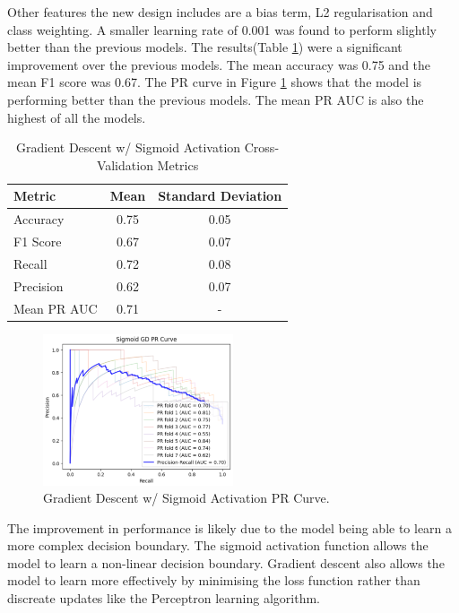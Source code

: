 Other features the new design includes are a bias term, L2 regularisation and class weighting. A smaller learning rate of 0.001 was found to perform slightly better than the previous models. The results(Table \ref{tab:gd_metrics}) were a significant improvement over the previous models. The mean accuracy was 0.75 and the mean F1 score was 0.67. The PR curve in Figure \ref{fig:gd_pr} shows that the model is performing better than the previous models. The mean PR AUC is also the highest of all the models.

\begin{table}[ht!]
    \centering
    \begin{tabular}{lcc}
        \toprule
        \textbf{Metric} & \textbf{Mean} & \textbf{Standard Deviation} \\
        \midrule
        Accuracy & 0.75 & 0.05 \\
        F1 Score & 0.67 & 0.07 \\
        Recall & 0.72 & 0.08 \\
        Precision & 0.62 & 0.07 \\
        Mean PR AUC & 0.71 & - \\
        \bottomrule
    \end{tabular}
    \caption{Gradient Descent w/ Sigmoid Activation Cross-Validation Metrics}
    \label{tab:gd_metrics}
\end{table}

\begin{figure}[ht!]
    \centering
    \includegraphics[width=0.5\textwidth]{images/gd_pr.png}
    \caption{Gradient Descent w/ Sigmoid Activation PR Curve.}
    \label{fig:gd_pr}
\end{figure}

The improvement in performance is likely due to the model being able to learn a more complex decision boundary. The sigmoid activation function allows the model to learn a non-linear decision boundary. Gradient descent also allows the model to learn more effectively by minimising the loss function rather than discreate updates like the Perceptron learning algorithm.

